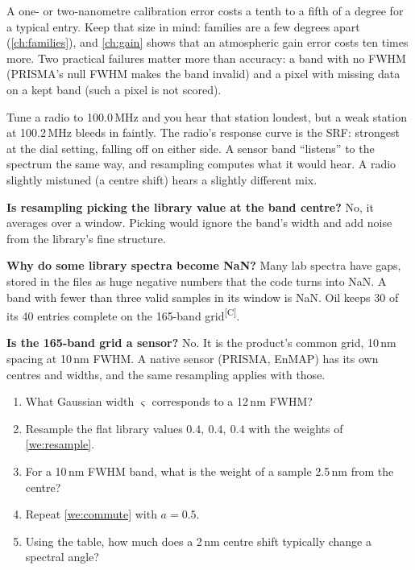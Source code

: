 \documentclass[11pt,a4paper,oneside,openany]{book}
\newcommand{\comp}{\textsuperscript{\textsf{\scriptsize[C]}}}
\begin{document}
A one- or two-nanometre calibration error costs a tenth to a fifth of a degree for a typical entry. Keep that size in mind: families
are a few degrees apart (\cref{ch:families}), and \cref{ch:gain} shows that an atmospheric gain error costs ten times more. Two
practical failures matter more than accuracy: a band with no FWHM (PRISMA's null FWHM makes the band invalid) and a pixel with
missing data on a kept band (such a pixel is not scored).

\begin{analogy}
Tune a radio to 100.0\,MHz and you hear that station loudest, but a weak station at 100.2\,MHz bleeds in faintly. The radio's
response curve is the SRF: strongest at the dial setting, falling off on either side. A sensor band ``listens'' to the spectrum the
same way, and resampling computes what it would hear. A radio slightly mistuned (a centre shift) hears a slightly different mix.
\end{analogy}

\begin{confusions}
\textbf{Is resampling picking the library value at the band centre?} No, it averages over a window. Picking would ignore the
band's width and add noise from the library's fine structure.

\textbf{Why do some library spectra become NaN?} Many lab spectra have gaps, stored in the files as huge negative numbers that the
code turns into NaN. A band with fewer than three valid
samples in its window is NaN. Oil keeps 30 of its 40 entries complete on the 165-band grid\comp.

\textbf{Is the 165-band grid a sensor?} No. It is the product's common grid, 10\,nm spacing at 10\,nm FWHM. A native sensor (PRISMA,
EnMAP) has its own centres and widths, and the same resampling applies with those.
\end{confusions}

\begin{checkyourself}
\begin{enumerate}
\item What Gaussian width $\varsigma$ corresponds to a 12\,nm FWHM?
\item Resample the flat library values $0.4,\ 0.4,\ 0.4$ with the weights of \cref{we:resample}.
\item For a 10\,nm FWHM band, what is the weight of a sample 2.5\,nm from the centre?
\item Repeat \cref{we:commute} with $a=0.5$.
\item Using the table, how much does a 2\,nm centre shift typically change a spectral angle?
\end{enumerate}
\end{checkyourself}
\end{document}
